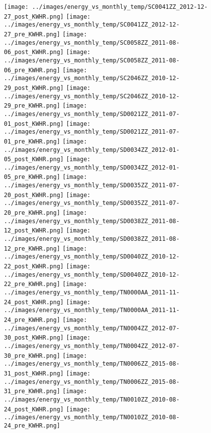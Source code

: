 \clearpage
\begin{figure}
\centering
\texttt{[image: ../images/energy\_vs\_monthly\_temp/SC0041ZZ\_2012-12-27\_post\_KWHR.png]}
\texttt{[image: ../images/energy\_vs\_monthly\_temp/SC0041ZZ\_2012-12-27\_pre\_KWHR.png]}
\texttt{[image: ../images/energy\_vs\_monthly\_temp/SC0058ZZ\_2011-08-06\_post\_KWHR.png]}
\texttt{[image: ../images/energy\_vs\_monthly\_temp/SC0058ZZ\_2011-08-06\_pre\_KWHR.png]}
\texttt{[image: ../images/energy\_vs\_monthly\_temp/SC2046ZZ\_2010-12-29\_post\_KWHR.png]}
\texttt{[image: ../images/energy\_vs\_monthly\_temp/SC2046ZZ\_2010-12-29\_pre\_KWHR.png]}
\texttt{[image: ../images/energy\_vs\_monthly\_temp/SD0021ZZ\_2011-07-01\_post\_KWHR.png]}
\texttt{[image: ../images/energy\_vs\_monthly\_temp/SD0021ZZ\_2011-07-01\_pre\_KWHR.png]}
\texttt{[image: ../images/energy\_vs\_monthly\_temp/SD0034ZZ\_2012-01-05\_post\_KWHR.png]}
\texttt{[image: ../images/energy\_vs\_monthly\_temp/SD0034ZZ\_2012-01-05\_pre\_KWHR.png]}
\texttt{[image: ../images/energy\_vs\_monthly\_temp/SD0035ZZ\_2011-07-20\_post\_KWHR.png]}
\texttt{[image: ../images/energy\_vs\_monthly\_temp/SD0035ZZ\_2011-07-20\_pre\_KWHR.png]}
\texttt{[image: ../images/energy\_vs\_monthly\_temp/SD0038ZZ\_2011-08-12\_post\_KWHR.png]}
\texttt{[image: ../images/energy\_vs\_monthly\_temp/SD0038ZZ\_2011-08-12\_pre\_KWHR.png]}
\texttt{[image: ../images/energy\_vs\_monthly\_temp/SD0040ZZ\_2010-12-22\_post\_KWHR.png]}
\texttt{[image: ../images/energy\_vs\_monthly\_temp/SD0040ZZ\_2010-12-22\_pre\_KWHR.png]}
\texttt{[image: ../images/energy\_vs\_monthly\_temp/TN0000AA\_2011-11-24\_post\_KWHR.png]}
\texttt{[image: ../images/energy\_vs\_monthly\_temp/TN0000AA\_2011-11-24\_pre\_KWHR.png]}
\texttt{[image: ../images/energy\_vs\_monthly\_temp/TN0004ZZ\_2012-07-30\_post\_KWHR.png]}
\texttt{[image: ../images/energy\_vs\_monthly\_temp/TN0004ZZ\_2012-07-30\_pre\_KWHR.png]}
\texttt{[image: ../images/energy\_vs\_monthly\_temp/TN0006ZZ\_2015-08-31\_post\_KWHR.png]}
\texttt{[image: ../images/energy\_vs\_monthly\_temp/TN0006ZZ\_2015-08-31\_pre\_KWHR.png]}
\texttt{[image: ../images/energy\_vs\_monthly\_temp/TN0010ZZ\_2010-08-24\_post\_KWHR.png]}
\texttt{[image: ../images/energy\_vs\_monthly\_temp/TN0010ZZ\_2010-08-24\_pre\_KWHR.png]}
\end{figure}
